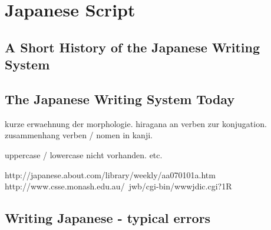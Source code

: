 
\chapter{Japanese Script}

\minitoc

\section{A Short History of the Japanese Writing System}
\label{sec:ahorthistoryofjapanesewritingsystem}

\section{The Japanese Writing System Today}
\label{sec:japanesewritingsystemtoday}

kurze erwaehnung der morphologie. hiragana an verben zur konjugation.
zusammenhang verben / nomen in kanji.

uppercase / lowercase nicht vorhanden. etc.

http://japanese.about.com/library/weekly/aa070101a.htm
http://www.csse.monash.edu.au/~jwb/cgi-bin/wwwjdic.cgi?1R


\section{Writing Japanese - typical errors}

